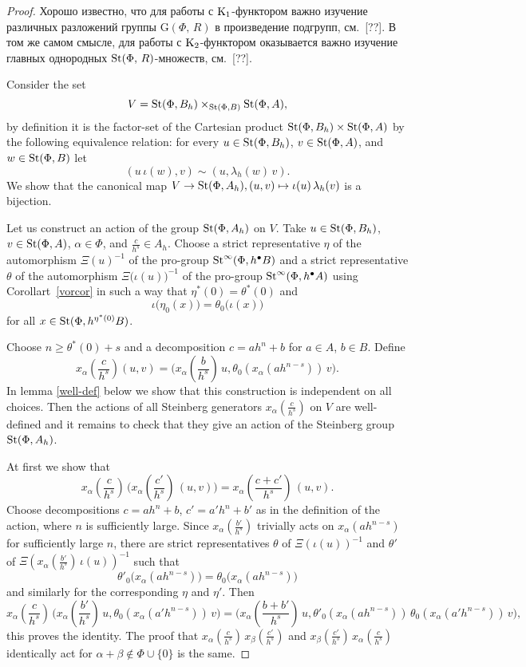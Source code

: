 \documentclass[oneside, 11pt]{amsart} \pdfoutput=1
\begin{document}
\begin{proof}
Хорошо известно, что для работы с ${\mathrm{K}}_1$-функтором важно изучение различных разложений группы $\mathrm G(\Phi,\,R)$ в произведение подгрупп, см.~[??]. В том же самом смысле, для работы с ${\mathrm{K}}_2$-функтором оказывается важно изучение главных однородных $\mathop{\mathrm{St}}\nolimits(\Phi,\,R)$-множеств, см.~[??].

Consider the set
$$
V = \mathop{\mathrm{St}}\nolimits(\Phi, B_h) \times_{\mathop{\mathrm{St}}\nolimits(\Phi, B)} \mathop{\mathrm{St}}\nolimits(\Phi, A),
$$
by definition it is the factor-set of the Cartesian product $\mathop{\mathrm{St}}\nolimits(\Phi, B_h) \times \mathop{\mathrm{St}}\nolimits(\Phi, A)$ by the following equivalence relation: for every $u \in \mathop{\mathrm{St}}\nolimits(\Phi, B_h)$, $v \in \mathop{\mathrm{St}}\nolimits(\Phi, A)$, and $w \in \mathop{\mathrm{St}}\nolimits(\Phi, B)$ let
$$
(u\, \iota(w), v) \sim (u, \lambda_h(w)\, v).
$$
We show that the canonical map $V \to \mathop{\mathrm{St}}\nolimits(\Phi, A_h), (u, v) \mapsto \iota(u)\, \lambda_h(v)$ is a bijection.

Let us construct an action of the group $\mathop{\mathrm{St}}\nolimits(\Phi, A_h)$ on $V$. Take $u \in \mathop{\mathrm{St}}\nolimits(\Phi, B_h)$, $v \in \mathop{\mathrm{St}}\nolimits(\Phi, A)$, $\alpha \in \Phi$, and $\frac c {h^s} \in A_h$. Choose a strict representative $\eta$ of the automorphism $\Xi(u)^{-1}$ of the pro-group $\mathop{\mathrm{St}}\nolimits^\infty(\Phi, h^\bullet B)$ and a strict representative $\theta$ of the automorphism $\Xi\bigl(\iota(u)\bigr)^{-1}$ of the pro-group $\mathop{\mathrm{St}}\nolimits^\infty(\Phi, h^\bullet A)$ using Corollart~\ref{vorcor} in such a way that $\eta^*(0) = \theta^*(0)$ and $$\iota\bigl(\eta_0(x)\bigr) = \theta_0\bigl(\iota(x)\bigr)$$ for all $x\in\mathop{\mathrm{St}}\nolimits(\Phi, h^{\eta^*(0)}B)$.

Choose $n \geq \theta^*(0) + s$ and a decomposition $c = ah^n + b$ for $a \in A$, $b \in B$. Define
$$\textstyle
x_\alpha(\frac c {h^s}) (u, v) = \bigl(x_\alpha(\frac b {h^s})\, u, \theta_0(x_\alpha(ah^{n - s}))\, v\bigr).
$$
In lemma \ref{well-def} below we show that this construction is independent on all choices. Then the actions of all Steinberg generators $x_\alpha(\frac c {h^s})$ on $V$ are well-defined and it remains to check that they give an action of the Steinberg group $\mathop{\mathrm{St}}\nolimits(\Phi, A_h)$.

At first we show that 
$$\textstyle
x_\alpha(\frac c {h^s})\, \bigl(x_\alpha(\frac{c'}{h^s})\, (u, v)\bigr) = x_\alpha(\frac{c+c'}{h^s})\, (u, v).
$$
Choose decompositions $c = ah^n + b$, $c' = a'h^n + b'$ as in the definition of the action, where \(n\) is sufficiently large. Since $x_\alpha(\frac{b'}{h^s})$ trivially acts on $x_\alpha(ah^{n-s})$ for sufficiently large $n$, there are strict representatives $\theta$ of $\Xi(\iota(u))^{-1}$ and $\theta'$ of $\Xi(x_\alpha(\frac{b'}{h^s})\, \iota(u))^{-1}$ such that
$$
\theta'_0\bigl(x_\alpha(ah^{n-s})\bigr) = \theta_0\bigl(x_\alpha(ah^{n-s})\bigr)
$$
and similarly for the corresponding $\eta$ and $\eta'$. Then
$$\textstyle
x_\alpha(\frac c {h^s})\, \bigl(x_\alpha(\frac{b'}{h^s})\, u, \theta_0(x_\alpha(a' h^{n-s}))\, v\bigr) = \bigl(x_\alpha(\frac{b + b'}{h^s})\, u, \theta'_0(x_\alpha(a h^{n - s}))\, \theta_0(x_\alpha(a' h^{n - s}))\, v\bigr),
$$
this proves the identity. The proof that $x_\alpha(\frac c {h^s})\, x_\beta(\frac{c'}{h^s})$ and $x_\beta(\frac{c'}{h^s})\, x_\alpha(\frac c {h^s})$ identically act for $\alpha + \beta \notin \Phi \cup \{0\}$ is the same.


\end{proof}
\end{document}
